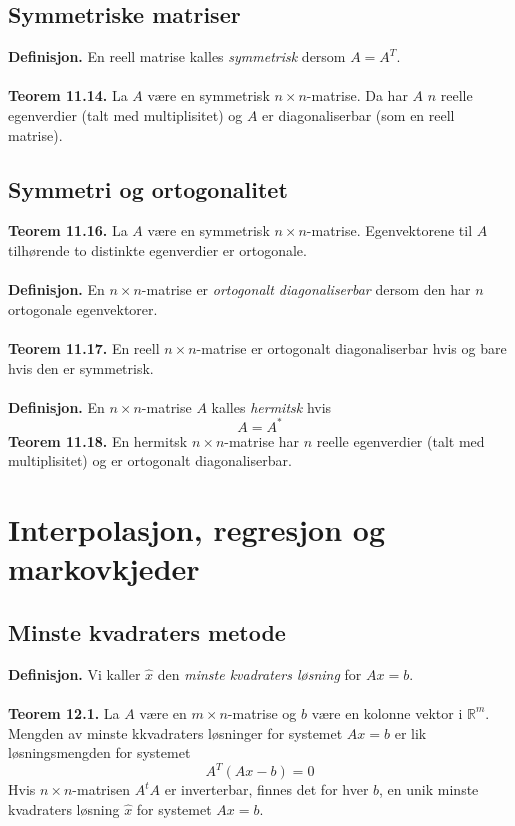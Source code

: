 \documentclass{article}
\begin{document}
\subsection{Symmetriske matriser}
\textbf{Definisjon.} En reell matrise kalles \textit{symmetrisk} dersom $A = A^T$.
\\\\
\textbf{Teorem 11.14.} La $A$ være en symmetrisk $n \times n$-matrise. Da har $A$ $n$ reelle egenverdier (talt med multiplisitet) og $A$ er diagonaliserbar (som en reell matrise).


\subsection{Symmetri og ortogonalitet}
\textbf{Teorem 11.16.} La $A$ være en symmetrisk $n \times n$-matrise. Egenvektorene til $A$ tilhørende to distinkte egenverdier er ortogonale.
\\\\
\textbf{Definisjon.} En $n \times n$-matrise er \textit{ortogonalt diagonaliserbar} dersom den har $n$ ortogonale egenvektorer.
\\\\
\textbf{Teorem 11.17.} En reell $n \times n$-matrise er ortogonalt diagonaliserbar hvis og bare hvis den er symmetrisk.
\\\\
\textbf{Definisjon.} En $n \times n$-matrise $A$ kalles \textit{hermitsk} hvis
\[ A = A^* \]
\textbf{Teorem 11.18.} En hermitsk $n \times n$-matrise har $n$ reelle egenverdier (talt med multiplisitet) og er ortogonalt diagonaliserbar.

\clearpage
\section{Interpolasjon, regresjon og markovkjeder}

\subsection{Minste kvadraters metode}
\textbf{Definisjon.} Vi kaller $\hat{x}$ den \textit{minste kvadraters løsning} for $Ax = b$.
\\\\
\textbf{Teorem 12.1.} La $A$ være en $m \times n$-matrise og $b$ være en kolonne vektor i $\mathbb{R}^m$. Mengden av minste kkvadraters løsninger for systemet $Ax = b$ er lik løsningsmengden for systemet
\[ A^T(Ax-b)=0 \]
Hvis $n \times n$-matrisen $A^tA$ er inverterbar, finnes det for hver $b$, en unik minste kvadraters løsning $\hat{x}$ for systemet $Ax = b$.
\end{document}
